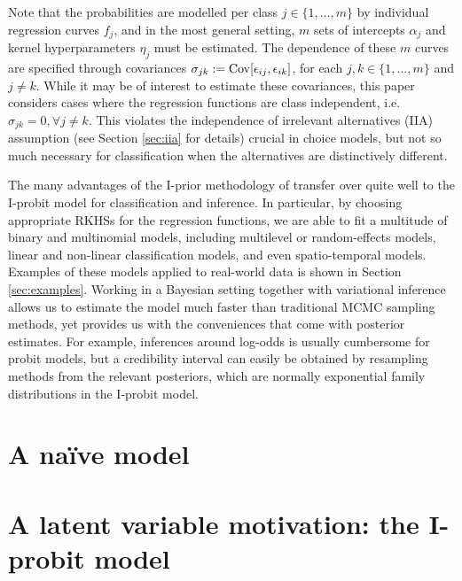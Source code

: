 \documentclass[a4paper,showframe,11pt]{report}
\begin{document}
Note that the probabilities are modelled per class $j\in\{1,\dots,m\}$ by individual regression curves $f_j$, and in the most general setting, $m$ sets of intercepts $\alpha_j$ and kernel hyperparameters $\eta_j$ must be estimated.
The dependence of these $m$ curves are specified through covariances $\sigma_{jk} := \operatorname{Cov}[\epsilon_{ij}, \epsilon_{ik}]$, 
for each $j,k\in\{1,\dots,m\}$ and $j\neq k$.
While it may be of interest to estimate these covariances, this paper considers cases where the regression functions are class independent, i.e. $\sigma_{jk} = 0,\forall j \neq k$.
This violates the independence of irrelevant alternatives (IIA) assumption (see Section \ref{sec:iia} for details) crucial in choice models, but not so much necessary for classification when the alternatives are distinctively different.



The many advantages of the I-prior methodology of \cite{jamil2017} transfer over quite well to the I-probit model for classification and inference.
In particular, by choosing appropriate RKHSs for the regression functions, we are able to fit a multitude of binary and multinomial models, including multilevel or random-effects models, linear and non-linear classification models, and even spatio-temporal models.
Examples of these models applied to real-world data is shown in Section \ref{sec:examples}.
Working in a Bayesian setting together with variational inference allows us to estimate the model much faster than traditional MCMC sampling methods, yet provides us with the conveniences that come with posterior estimates.
For example, inferences around log-odds is usually cumbersome for probit models, but a credibility interval can easily be obtained by resampling methods from the relevant posteriors, which are normally exponential family distributions in the I-probit model.


\newpage
\section{A naïve model}


\section{A latent variable motivation: the I-probit model}

\end{document}
